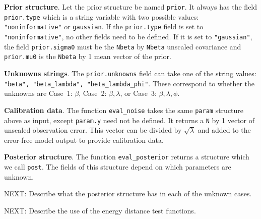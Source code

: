 \documentclass{book}
\begin{document}
\vspace{.1in}
\textbf{Prior structure}. Let the prior structure be named {\tt prior}. It always has the field {\tt prior.type} which is a string variable with
two possible values: {\tt "noninformative"} or {\tt gaussian}. If the {\tt prior.type} field is set to {\tt "noninformative"}, no other
fields need to be defined. If it is set to {\tt "gaussian"}, the field {\tt prior.sigma0} must be the {\tt Nbeta} by {\tt Nbeta}
unscaled covariance and {\tt prior.mu0} is the {\tt Nbeta} by 1 mean vector of the prior. 

\vspace{.1in}
\textbf{Unknowns strings}. The {\tt prior.unknowns} field can take one of the string values:
{\tt "beta", "beta\_lambda", "beta\_lambda\_phi"}. These correspond to whether the unknowns are Case~1: $\beta$, 
Case~2: $\beta, \lambda$, or Case~3: $\beta,\lambda,\phi$. 

\vspace{.1in}
\textbf{Calibration data}. The function {\tt eval\_noise} takes the same {\tt param} structure above as input, except {\tt param.y}
need not be defined. It returns a {\tt N} by 1 vector of unscaled observation error. This vector can be divided by $\sqrt{\lambda}$
and added to the error-free model output to provide calibration data.

\vspace{.1in}
\textbf{Posterior structure}. The function {\tt eval\_posterior} returns a structure which we call {\tt post}. The fields of
this structure depend on which parameters are unknown. 


NEXT: Describe what the posterior structure has in each of the unknown cases.

NEXT: Describe the use of the energy distance test functions. 
\end{document}
